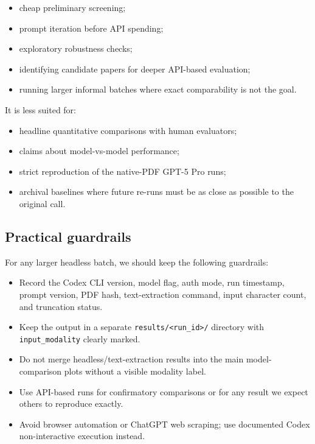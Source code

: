 \documentclass[
  11pt,
  letterpaper,
]{article}
\providecommand{\tightlist}{%
  \setlength{\itemsep}{0pt}\setlength{\parskip}{0pt}}
\begin{document}
\begin{itemize}
\tightlist
\item
  cheap preliminary screening;
\item
  prompt iteration before API spending;
\item
  exploratory robustness checks;
\item
  identifying candidate papers for deeper API-based evaluation;
\item
  running larger informal batches where exact comparability is not the
  goal.
\end{itemize}

It is less suited for:

\begin{itemize}
\tightlist
\item
  headline quantitative comparisons with human evaluators;
\item
  claims about model-vs-model performance;
\item
  strict reproduction of the native-PDF GPT-5 Pro runs;
\item
  archival baselines where future re-runs must be as close as possible
  to the original call.
\end{itemize}

\subsection{Practical guardrails}\label{practical-guardrails}

For any larger headless batch, we should keep the following guardrails:

\begin{itemize}
\tightlist
\item
  Record the Codex CLI version, model flag, auth mode, run timestamp,
  prompt version, PDF hash, text-extraction command, input character
  count, and truncation status.
\item
  Keep the output in a separate
  \texttt{results/\textless{}run\_id\textgreater{}/} directory with
  \texttt{input\_modality} clearly marked.
\item
  Do not merge headless/text-extraction results into the main
  model-comparison plots without a visible modality label.
\item
  Use API-based runs for confirmatory comparisons or for any result we
  expect others to reproduce exactly.
\item
  Avoid browser automation or ChatGPT web scraping; use documented Codex
  non-interactive execution instead.
\end{itemize}
\end{document}
